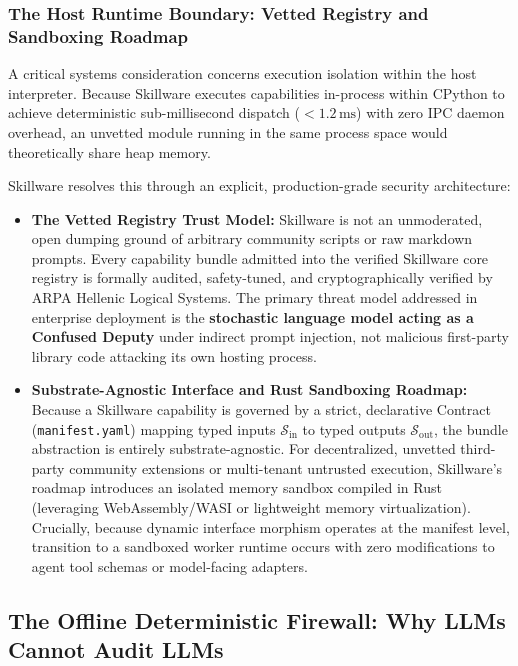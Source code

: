 \subsubsection{The Host Runtime Boundary: Vetted Registry and Sandboxing Roadmap}
A critical systems consideration concerns execution isolation within the host interpreter. Because Skillware executes capabilities in-process within CPython to achieve deterministic sub-millisecond dispatch ($<1.2\,\text{ms}$) with zero IPC daemon overhead, an unvetted module running in the same process space would theoretically share heap memory. 

Skillware resolves this through an explicit, production-grade security architecture:
\begin{itemize}[leftmargin=*]
  \item \textbf{The Vetted Registry Trust Model:} Skillware is not an unmoderated, open dumping ground of arbitrary community scripts or raw markdown prompts. Every capability bundle admitted into the verified Skillware core registry is formally audited, safety-tuned, and cryptographically verified by ARPA Hellenic Logical Systems. The primary threat model addressed in enterprise deployment is the \textbf{stochastic language model acting as a Confused Deputy} under indirect prompt injection, not malicious first-party library code attacking its own hosting process.
  \item \textbf{Substrate-Agnostic Interface and Rust Sandboxing Roadmap:} Because a Skillware capability is governed by a strict, declarative Contract (\texttt{manifest.yaml}) mapping typed inputs $\mathcal{S}_{\text{in}}$ to typed outputs $\mathcal{S}_{\text{out}}$, the bundle abstraction is entirely substrate-agnostic. For decentralized, unvetted third-party community extensions or multi-tenant untrusted execution, Skillware's roadmap introduces an isolated memory sandbox compiled in Rust (leveraging WebAssembly/WASI or lightweight memory virtualization). Crucially, because dynamic interface morphism operates at the manifest level, transition to a sandboxed worker runtime occurs with zero modifications to agent tool schemas or model-facing adapters.
\end{itemize}

\subsection{The Offline Deterministic Firewall: Why LLMs Cannot Audit LLMs}
\label{subsec:offline_firewall}

